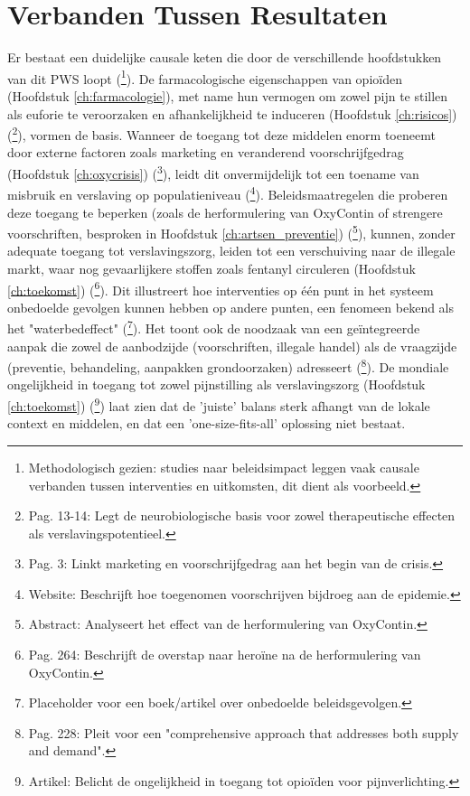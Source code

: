 \documentclass[11pt, a4paper]{report} %
\begin{document}
\section{Verbanden Tussen Resultaten}
Er bestaat een duidelijke causale keten die door de verschillende hoofdstukken van dit PWS loopt (\cite{Bradford2018MedicalCannabisOpioidPrescribing}\footnote{Methodologisch gezien: studies naar beleidsimpact leggen vaak causale verbanden tussen interventies en uitkomsten, dit dient als voorbeeld.}). De farmacologische eigenschappen van opioïden (Hoofdstuk \ref{ch:farmacologie}), met name hun vermogen om zowel pijn te stillen als euforie te veroorzaken en afhankelijkheid te induceren (Hoofdstuk \ref{ch:risicos}) (\cite{Kosten2002NeurobiologyDependence}\footnote{Pag. 13-14: Legt de neurobiologische basis voor zowel therapeutische effecten als verslavingspotentieel.}), vormen de basis. Wanneer de toegang tot deze middelen enorm toeneemt door externe factoren zoals marketing en veranderend voorschrijfgedrag (Hoofdstuk \ref{ch:oxycrisis}) (\cite{Maclean2020EconomicStudiesOpioid}\footnote{Pag. 3: Linkt marketing en voorschrijfgedrag aan het begin van de crisis.}), leidt dit onvermijdelijk tot een toename van misbruik en verslaving op populatieniveau (\cite{CDCUnderstandingEpidemic}\footnote{Website: Beschrijft hoe toegenomen voorschrijven bijdroeg aan de epidemie.}). Beleidsmaatregelen die proberen deze toegang te beperken (zoals de herformulering van OxyContin of strengere voorschriften, besproken in Hoofdstuk \ref{ch:artsen_preventie}) (\cite{Alpert2018SupplySideOxyContin}\footnote{Abstract: Analyseert het effect van de herformulering van OxyContin.}), kunnen, zonder adequate toegang tot verslavingszorg, leiden tot een verschuiving naar de illegale markt, waar nog gevaarlijkere stoffen zoals fentanyl circuleren (Hoofdstuk \ref{ch:toekomst}) (\cite{Cicero2017Review}\footnote{Pag. 264: Beschrijft de overstap naar heroïne na de herformulering van OxyContin.}). Dit illustreert hoe interventies op één punt in het systeem onbedoelde gevolgen kunnen hebben op andere punten, een fenomeen bekend als het "waterbedeffect" (\cite{UnintendedConsequencesPolicyBook}\footnote{Placeholder voor een boek/artikel over onbedoelde beleidsgevolgen.}). Het toont ook de noodzaak van een geïntegreerde aanpak die zowel de aanbodzijde (voorschriften, illegale handel) als de vraagzijde (preventie, behandeling, aanpakken grondoorzaken) adresseert (\cite{Volkow2021ChangingOpioidCrisis}\footnote{Pag. 228: Pleit voor een "comprehensive approach that addresses both supply and demand".}). De mondiale ongelijkheid in toegang tot zowel pijnstilling als verslavingszorg (Hoofdstuk \ref{ch:toekomst}) (\cite{UCLNews2022GlobalDisparities}\footnote{Artikel: Belicht de ongelijkheid in toegang tot opioïden voor pijnverlichting.}) laat zien dat de 'juiste' balans sterk afhangt van de lokale context en middelen, en dat een 'one-size-fits-all' oplossing niet bestaat.
\end{document}
